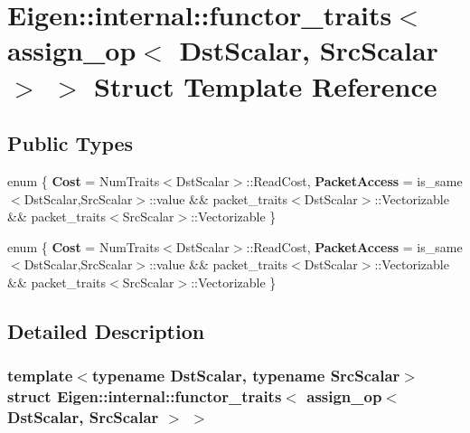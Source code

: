 \hypertarget{struct_eigen_1_1internal_1_1functor__traits_3_01assign__op_3_01_dst_scalar_00_01_src_scalar_01_4_01_4}{}\section{Eigen\+:\+:internal\+:\+:functor\+\_\+traits$<$ assign\+\_\+op$<$ Dst\+Scalar, Src\+Scalar $>$ $>$ Struct Template Reference}
\label{struct_eigen_1_1internal_1_1functor__traits_3_01assign__op_3_01_dst_scalar_00_01_src_scalar_01_4_01_4}
\subsection*{Public Types}
\begin{DoxyCompactItemize}
\item 
\mbox{\label{struct_eigen_1_1internal_1_1functor__traits_3_01assign__op_3_01_dst_scalar_00_01_src_scalar_01_4_01_4_a9f4ed8678e6df2caed5db898a2576bc7}} 
enum \{ {\bfseries Cost} = Num\+Traits$<$Dst\+Scalar$>$\+:\+:Read\+Cost, 
{\bfseries Packet\+Access} = is\+\_\+same$<$Dst\+Scalar,Src\+Scalar$>$\+:\+:value \&\& packet\+\_\+traits$<$Dst\+Scalar$>$\+:\+:Vectorizable \&\& packet\+\_\+traits$<$Src\+Scalar$>$\+:\+:Vectorizable
 \}
\item 
\mbox{\label{struct_eigen_1_1internal_1_1functor__traits_3_01assign__op_3_01_dst_scalar_00_01_src_scalar_01_4_01_4_a6d986deb0053943cc75987a2496cd0c7}} 
enum \{ {\bfseries Cost} = Num\+Traits$<$Dst\+Scalar$>$\+:\+:Read\+Cost, 
{\bfseries Packet\+Access} = is\+\_\+same$<$Dst\+Scalar,Src\+Scalar$>$\+:\+:value \&\& packet\+\_\+traits$<$Dst\+Scalar$>$\+:\+:Vectorizable \&\& packet\+\_\+traits$<$Src\+Scalar$>$\+:\+:Vectorizable
 \}
\end{DoxyCompactItemize}


\subsection{Detailed Description}
\subsubsection*{template$<$typename Dst\+Scalar, typename Src\+Scalar$>$\newline
struct Eigen\+::internal\+::functor\+\_\+traits$<$ assign\+\_\+op$<$ Dst\+Scalar, Src\+Scalar $>$ $>$}



